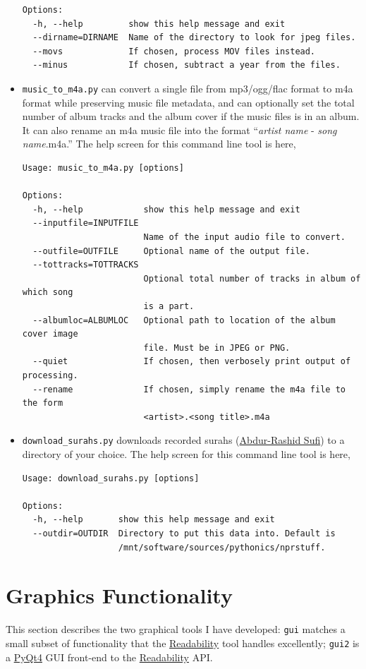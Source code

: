 \documentclass[]{article}
\begin{document}
\begin{itemize}
\begin{verbatim}
Options:
  -h, --help         show this help message and exit
  --dirname=DIRNAME  Name of the directory to look for jpeg files.
  --movs             If chosen, process MOV files instead.
  --minus            If chosen, subtract a year from the files.
\end{verbatim}
 
 \item {\verb|music_to_m4a.py|} can convert a single file from mp3/ogg/flac format to m4a format while preserving music file metadata, and can optionally set the total number of album tracks and the album cover if the music files is in an album. It can also rename an m4a music file into the format ``\textit{artist name} - \textit{song name}.m4a.'' The help screen for this command line tool is here,
\begin{verbatim}
Usage: music_to_m4a.py [options]

Options:
  -h, --help            show this help message and exit
  --inputfile=INPUTFILE
                        Name of the input audio file to convert.
  --outfile=OUTFILE     Optional name of the output file.
  --tottracks=TOTTRACKS
                        Optional total number of tracks in album of which song
                        is a part.
  --albumloc=ALBUMLOC   Optional path to location of the album cover image
                        file. Must be in JPEG or PNG.
  --quiet               If chosen, then verbosely print output of processing.
  --rename              If chosen, simply rename the m4a file to the form
                        <artist>.<song title>.m4a
\end{verbatim}
 
 \item {\verb|download_surahs.py|} downloads recorded surahs (\href{http://quranicaudio.com/quran/109}{Abdur-Rashid Sufi}) to a directory of your choice. The help screen for this command line tool is here,
\begin{verbatim}
Usage: download_surahs.py [options]

Options:
  -h, --help       show this help message and exit
  --outdir=OUTDIR  Directory to put this data into. Default is
                   /mnt/software/sources/pythonics/nprstuff.
\end{verbatim}
\end{itemize}

\section{Graphics Functionality}\label{sec:graphics_functionality}
This section describes the two graphical tools I have developed:
{\verb|gui|} matches a small subset of functionality that the
\href{https://www.readability.com}{Readability} tool handles
excellently; {\verb|gui2|} is a
\href{https://www.riverbankcomputing.com/software/pyqt/download}{PyQt4}
GUI front-end to the \href{https://www.readability.com}{Readability}
API.
\end{document}
